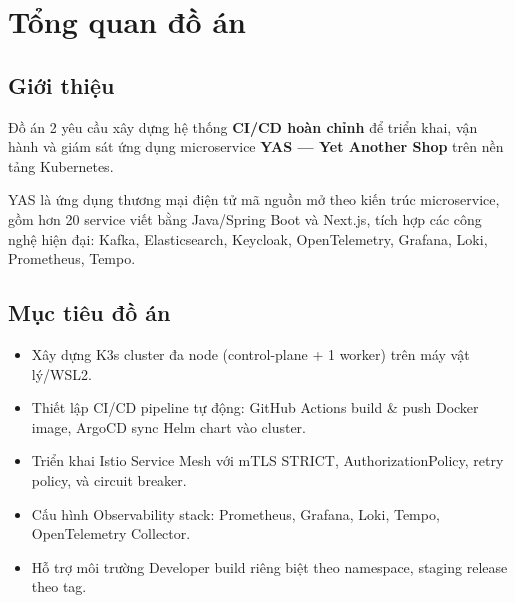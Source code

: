 \section{Tổng quan đồ án}
\subsection{Giới thiệu}
Đồ án 2 yêu cầu xây dựng hệ thống \textbf{CI/CD hoàn chỉnh} để triển khai, vận hành và giám sát ứng dụng microservice \textbf{YAS — Yet Another Shop} trên nền tảng Kubernetes.

YAS là ứng dụng thương mại điện tử mã nguồn mở theo kiến trúc microservice, gồm hơn 20 service viết bằng Java/Spring Boot và Next.js, tích hợp các công nghệ hiện đại: Kafka, Elasticsearch, Keycloak, OpenTelemetry, Grafana, Loki, Prometheus, Tempo.

\subsection{Mục tiêu đồ án}
\begin{itemize}
    \item Xây dựng K3s cluster đa node (control-plane + 1 worker) trên máy vật lý/WSL2.
    \item Thiết lập CI/CD pipeline tự động: GitHub Actions build \& push Docker image, ArgoCD sync Helm chart vào cluster.
    \item Triển khai Istio Service Mesh với mTLS STRICT, AuthorizationPolicy, retry policy, và circuit breaker.
    \item Cấu hình Observability stack: Prometheus, Grafana, Loki, Tempo, OpenTelemetry Collector.
    \item Hỗ trợ môi trường Developer build riêng biệt theo namespace, staging release theo tag.
\end{itemize}

